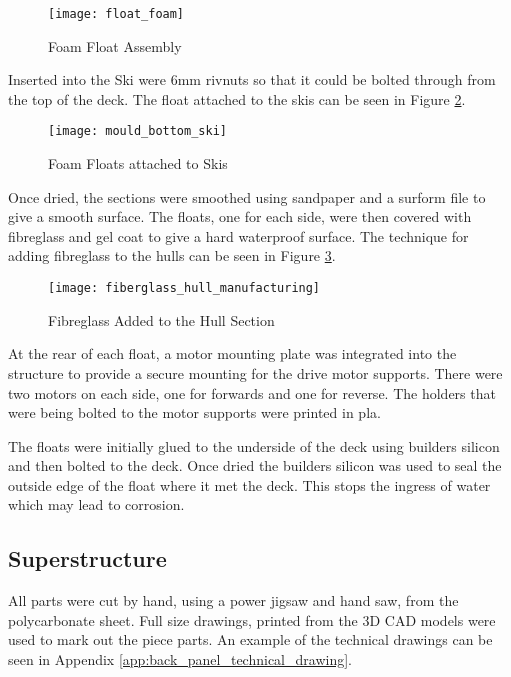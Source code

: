 \documentclass [12pt]{article}
\begin{document}
\begin{figure}[H]
\centerline{\texttt{[image: float\_foam]}}
\caption{Foam Float Assembly}
\label{fig:float_foam}
\end{figure}


Inserted into the Ski were 6mm \gls{rivnut}s so that it could be bolted through from the top of the deck. The float attached to the skis can be seen in Figure \ref{fig:mould_bottom_ski}.

\begin{figure}[H]
\centerline{\texttt{[image: mould\_bottom\_ski]}}
\caption{Foam Floats attached to Skis}
\label{fig:mould_bottom_ski}
\end{figure}

Once dried, the sections were smoothed using sandpaper and a surform file to give a smooth surface. The floats, one for each side, were then covered with fibreglass and gel coat to give a hard waterproof surface. The technique for adding fibreglass to the hulls can be seen in Figure \ref{fig:fiberglass_hull_manufacturing}.

\begin{figure}[H]
\centerline{\texttt{[image: fiberglass\_hull\_manufacturing]}}
\caption{Fibreglass Added to the Hull Section}
\label{fig:fiberglass_hull_manufacturing}
\end{figure}

At the rear of each float, a motor mounting plate was integrated into the structure to provide a secure mounting for the drive motor supports. There were two motors on each side, one for forwards and one for reverse. The holders that were being bolted to the motor supports were printed in \gls{pla}. 

The floats were initially glued to the underside of the deck using builders silicon and then bolted to the deck. Once dried the builders silicon was used to seal the outside edge of the float where it met the deck. This stops the ingress of water which may lead to corrosion.

\subsection{Superstructure}

All parts were cut by hand, using a power jigsaw and hand saw, from the polycarbonate sheet. Full size drawings, printed from the 3D CAD models were used to mark out the piece parts. An example of the technical drawings can be seen in Appendix \ref{app:back_panel_technical_drawing}.
\end{document}
